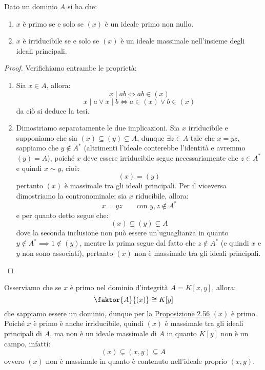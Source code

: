 \documentclass[11pt]{scrartcl}
\begin{document}
\begin{proposition}
    \label{2.86}
    Dato un dominio $A$ si ha che:
    \begin{enumerate}[(1)]
        \item $x$ è primo se e solo se $(x)$ è un ideale primo non nullo.
        \item $x$ è irriducibile se e solo se $(x)$ è un ideale massimale nell'insieme degli ideali principali.
    \end{enumerate}
\end{proposition}

\begin{proof}
    Verifichiamo entrambe le proprietà:
    \begin{enumerate}[(1)]
        \item Sia $x \in A$, allora:
            \[ x \mid ab \iff ab \in (x)
                \]
	    \[ x \mid a \vee x \mid b \iff a \in (x) \vee b \in (x)
	        \]
        da ciò si deduce la tesi.
        \item Dimostriamo separatamente le due implicazioni. Sia $x$ irriducibile e supponiamo che sia $(x) \subseteq (y) \subsetneq A$,
            dunque $\exists z \in A$ tale che $x = yz$, sappiamo che $y \not \in A^*$ (altrimenti l'ideale conterebbe l'identità
            e avremmo $(y) = A$), poiché $x$ deve essere irriducibile segue necessariamente che $z \in A^*$ e quindi $x \sim y$, cioè:
            \[ (x) = (y)
                \]
            pertanto $(x)$ è massimale tra gli ideali principali. Per il viceversa dimostriamo la contronominale; sia $x$ riducibile, allora:
            \[ x = yz \qquad \text{con $y,z \not \in A^*$}
                \]
            e per quanto detto segue che:
            \[ (x) \subsetneq (y) \subsetneq A
                \]
            dove la seconda inclusione non può essere un'uguaglianza in quanto $y \not \in A^* \implies 1 \not \in (y)$, mentre la prima segue dal 
            fatto che $z \not \in A^*$ (e quindi $x$ e $y$ non sono associati), pertanto $(x)$ non è massimale tra gli ideali principali.
    \end{enumerate}
\end{proof}

\begin{example}
    Osserviamo che se $x$ è primo nel dominio d'integrità $A = K[x,y]$, allora:
    \[ \faktor{A}{(x)} \cong K[y]
        \]
    che sappiamo essere un dominio, dunque per la \hyperref[2.56]{Proposizione 2.56} $(x)$ è primo. Poiché $x$ è primo è anche irriducibile, quindi $(x)$
    è massimale tra gli ideali principali di $A$, ma non è un ideale massimale di $A$ in quanto $K[y]$ non è un campo, infatti:
    \[ (x) \subsetneq (x,y) \subsetneq A
        \]
    ovvero $(x)$ non è massimale in quanto è contenuto nell'ideale proprio $(x,y)$.
\end{example}
\end{document}
